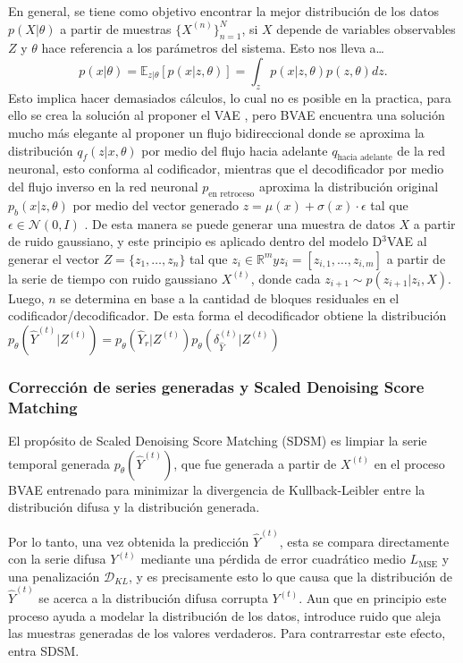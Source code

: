 \documentclass[12pt,letterpaper]{article}
\begin{document}
En general, se tiene como objetivo encontrar la mejor distribución de los datos $p(X|\theta)$ a partir de muestras $\{X^{(n)}\}_{n=1}^N$, si $X$ depende de variables observables $Z$ y $\theta$ hace referencia a los parámetros del sistema. Esto nos lleva a\dots
\begin{equation}
    p(x|\theta) = \mathbb{E}_{z|\theta}[p(x|z,\theta)] = \int_z p(x|z,\theta) p(z,\theta) dz.
\end{equation}
Esto implica hacer demasiados cálculos, lo cual no es posible en la practica, para ello se crea la solución al proponer el VAE \cite{kingma2013auto}, pero BVAE encuentra una solución mucho más elegante al proponer un flujo bidireccional donde se aproxima la distribución $q_f(z|x,\theta)$ por medio del flujo hacia adelante $q_{\text{hacia adelante}}$ de la red neuronal, esto conforma al codificador, mientras que el decodificador por medio del flujo inverso en la red neuronal $p_{\text{en retroceso}}$ aproxima la distribución original $p_b(x|z,\theta)$ por medio del vector generado $z=\mu(x)+\sigma(x)\cdot\epsilon$ tal que $\epsilon \in \mathcal{N}(0,I)$ \cite{kosko2024bidirectional}. 
De esta manera se puede generar una muestra de datos $X$ a partir de ruido gaussiano, y este principio es aplicado dentro del modelo D$^{3}$VAE al generar el vector $Z=\{z_1,\dots, z_n\}$ tal que $z_i\in \mathbb{R}^{m} y z_i=[z_{i,1}, \dots, z_{i,m}]$ a partir de la serie de tiempo con ruido gaussiano $X^{(t)}$, donde cada $z_{i+1}\sim p(z_{i+1}|z_i,X)$. Luego, $n$ se determina en base a la cantidad de bloques residuales en el codificador/decodificador. De esta forma el decodificador obtiene la distribución $p_{\theta}(\hat{Y}^{(t)}|Z^{(t)})=p_{\theta}(\hat{Y}_r|Z^{(t)})p_{\theta}(\delta_{\hat{Y}}^{(t)}|Z^{(t)})$

\subsubsection{Corrección de series generadas y Scaled Denoising Score Matching}
El propósito de Scaled Denoising Score Matching (SDSM) es limpiar la serie temporal generada $p_\theta(\hat{Y}^{(t)})$, que fue generada a partir de $X^{(t)}$ en el proceso BVAE entrenado para minimizar la divergencia de Kullback-Leibler entre la distribución difusa y la distribución generada.

Por lo tanto, una vez obtenida la predicción $\hat{Y}^{(t)}$, esta se compara directamente con la serie difusa $Y^{(t)}$ mediante una pérdida de error cuadrático medio $L_{\text{MSE}}$ y una penalización $\mathcal{D}_{KL}$, y es precisamente esto lo que causa que la distribución de $\hat{Y}^{(t)}$ se acerca a la distribución difusa corrupta $Y^{(t)}$. Aun que en principio este proceso ayuda a modelar la distribución de los datos, introduce ruido que aleja las muestras generadas de los valores verdaderos. Para contrarrestar este efecto, entra SDSM.
\end{document}
